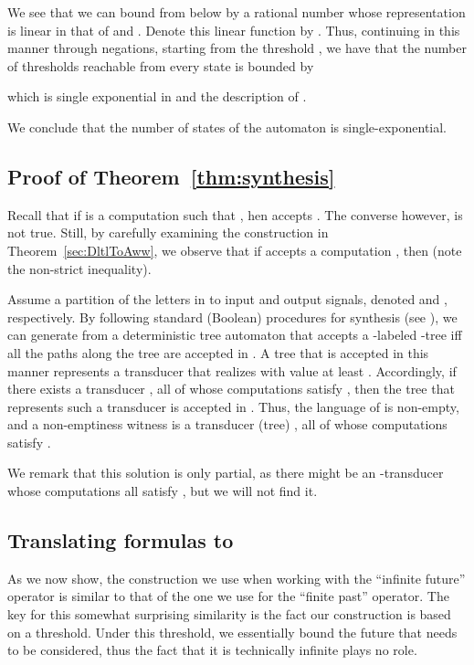 \documentclass{llncs}
\begin{document}
We see that we can bound  from below by a rational number whose representation is linear in that of  and . Denote this linear function by .
Thus, continuing in this manner through  negations, starting from the threshold , we have that the number of thresholds reachable from every state is bounded by

which is single exponential in  and the description of .

We conclude that the number of states of the automaton is single-exponential.


\subsection{Proof of Theorem~\ref{thm:synthesis}}
\label{apx: synthesis}
Recall that if  is a computation such that , hen  accepts . The converse however, is not true. Still, by carefully examining the construction in Theorem~\ref{sec:DltlToAww}, we observe that if  accepts a computation , then  (note the non-strict inequality). 

Assume a partition of the letters in  to input and output signals, denoted  and , respectively. By following standard (Boolean) procedures for synthesis (see \cite{PR89a}), we can generate from  a deterministic tree automaton  that accepts a -labeled -tree iff all the paths along the tree are accepted in . A tree that is accepted in this manner represents a transducer that realizes  with value at least . Accordingly, if there exists a transducer , all of whose computations satisfy , then the tree that represents such a transducer is accepted in . Thus, the language of  is non-empty, and a non-emptiness witness is a transducer (tree) , all of whose computations 
satisfy .



We remark that this solution is only partial, as there might be an -transducer whose computations  all satisfy , but we will not find it. 



\subsection{Translating  formulas to }
\label{apx:LTL with past}
As we now show, the construction we use when working with the ``infinite future''  operator is similar to that of the one we use for the ``finite past''  operator.
The key for this somewhat surprising similarity is the fact our construction is based on a threshold. Under this threshold, we essentially bound the future that needs to be considered, thus the fact that it is technically infinite plays no role.
\end{document}
